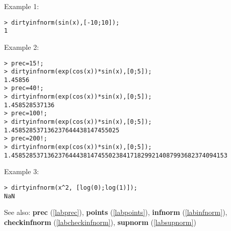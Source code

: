 \noindent Example 1: 
\begin{center}\begin{minipage}{15cm}\begin{Verbatim}[frame=single]
> dirtyinfnorm(sin(x),[-10;10]);
1
\end{Verbatim}
\end{minipage}\end{center}
\noindent Example 2: 
\begin{center}\begin{minipage}{15cm}\begin{Verbatim}[frame=single]
> prec=15!;
> dirtyinfnorm(exp(cos(x))*sin(x),[0;5]);
1.45856
> prec=40!;
> dirtyinfnorm(exp(cos(x))*sin(x),[0;5]);
1.458528537136
> prec=100!;
> dirtyinfnorm(exp(cos(x))*sin(x),[0;5]);
1.458528537136237644438147455025
> prec=200!;
> dirtyinfnorm(exp(cos(x))*sin(x),[0;5]);
1.458528537136237644438147455023841718299214087993682374094153
\end{Verbatim}
\end{minipage}\end{center}
\noindent Example 3: 
\begin{center}\begin{minipage}{15cm}\begin{Verbatim}[frame=single]
> dirtyinfnorm(x^2, [log(0);log(1)]);
NaN
\end{Verbatim}
\end{minipage}\end{center}
See also: \textbf{prec} (\ref{labprec}), \textbf{points} (\ref{labpoints}), \textbf{infnorm} (\ref{labinfnorm}), \textbf{checkinfnorm} (\ref{labcheckinfnorm}), \textbf{supnorm} (\ref{labsupnorm})
